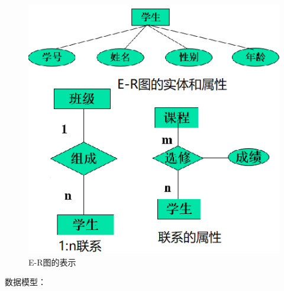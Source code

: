 \begin{figure}[H]
    \centering
    \includegraphics[scale=0.8]{./images/0019.png}
    \caption{E-R图的表示}
\end{figure}
数据模型：
